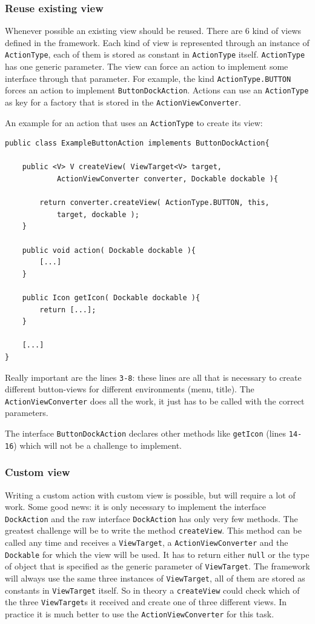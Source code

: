 \documentclass[a4paper,10pt]{article}
\newcommand{\src}[1]{\texttt{#1}}
\begin{document}
\subsubsection{Reuse existing view}
Whenever possible an existing view should be reused. There are 6 kind of views defined in the framework. Each kind of view is represented through an instance of \src{ActionType}, each of them is stored as constant in \src{ActionType} itself. \src{ActionType} has one generic parameter. The view can force an action to implement some interface through that parameter. For example, the kind \src{ActionType.BUTTON} forces an action to implement \src{ButtonDockAction}. Actions can use an \src{ActionType} as key for a factory that is stored in the \src{ActionViewConverter}. 

An example for an action that uses an \src{ActionType} to create its view:
\begin{lstlisting}
public class ExampleButtonAction implements ButtonDockAction{

	public <V> V createView( ViewTarget<V> target,
			ActionViewConverter converter, Dockable dockable ){
	
		return converter.createView( ActionType.BUTTON, this, 
			target, dockable );
	}
	
	public void action( Dockable dockable ){
		[...]
	}
	
	public Icon getIcon( Dockable dockable ){
		return [...];
	}
	
	[...]
}
\end{lstlisting}
Really important are the lines \src{3-8}: these lines are all that is necessary to create different button-views for different environments (menu, title). The \src{ActionViewConverter} does all the work, it just has to be called with the correct parameters.

The interface \src{ButtonDockAction} declares other methods like \src{getIcon} (lines \src{14-16}) which will not be a challenge to implement.

\subsubsection{Custom view}
Writing a custom action with custom view is possible, but will require a lot of work. Some good news: it is only necessary to implement the interface \src{DockAction} and the raw interface \src{DockAction} has only very few methods. The greatest challenge will be to write the method \src{createView}. This method can be called any time and receives a \src{ViewTarget}, a \src{ActionViewConverter} and the \src{Dockable} for which the view will be used. It has to return either \src{null} or the type of object that is specified as the generic parameter of \src{ViewTarget}. The framework will always use the same three instances of \src{ViewTarget}, all of them are stored as constants in \src{ViewTarget} itself. So in theory a \src{createView} could check which of the three \src{ViewTarget}s it received and create one of three different views. In practice it is much better to use the \src{ActionViewConverter} for this task.
\end{document}
